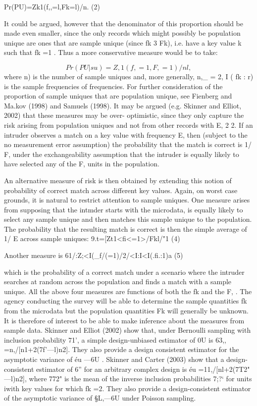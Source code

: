 Pr(PU)=Zk1(f,,=l,Fk=l)/n. (2)

It could be argued, however that the denominator of this proportion should be made even
smaller, since the only records which might possibly be population unique are ones that
are sample unique (since fk 3 Fk), i.e. have a key value k such that fk =1 . Thus a more
conservative measure would be to take:

\[Pr(PU | su) =Z,1(f, = 1, F, =1)/nl, \]
where n) is the number of sample uniques and, more generally, n,_ = 2, I ( fk : r) is the
sample frequencies of frequencies. For further consideration of the proportion of sample
uniques that are population unique, see Fienberg and Ma.kov (1998) and Samuels (1998).
It may be argued (e.g. Skinner and Elliot, 2002) that these measures may be over-
optimistic, since they only capture the risk arising from population uniques and not from
other records with E, 2 2. If an intruder observes a match on a key value with frequency
E, then (subject to the no measurement error assumption) the probability that the match
is correct is 1/ F, under the exchangeability assumption that the intruder is equally likely
to have selected any of the F, units in the population. 

An alternative measure of risk is
then obtained by extending this notion of probability of correct match across different
key values. Again, on worst case grounds, it is natural to restrict attention to sample
uniques. One measure arises from supposing that the intmder starts with the microdata, is
equally likely to select any sample unique and then matches this sample unique to the
population. The probability that the resulting match is correct is then the simple average
of 1/ E across sample uniques:
9.t=[Zt1<ﬁ<=1>/Fkl/"1 (4)

Another measure is
61/:Z;<I(_f/(=1)/2/<I:I<I(.ﬁ.:1)a (5)

which is the probability of a correct match under a scenario where the intruder searches at
random across the population and finds a match with a sample unique.
All the above four measures are functions of both the fk and the F, . The agency
conducting the survey will be able to determine the sample quantities fk from the
microdata but the population quantities Fk will generally be unknown. It is therefore of
interest to be able to make inference about the measures from sample data.
Skinner and Elliot (2002) show that, under Bernoulli sampling with inclusion
probability 71', a simple design-unbiased estimator of 0U is 63,, =n,/[n1+2(7f'—l)n2].
They also provide a design consistent estimator for the asymptotic variance of éu —6U .
Skinner and Carter (2003) show that a design-consistent estimator of 6” for an arbitrary
complex design is éu =11,/[nl+2(7T2" —l)n2], where 772" is the mean of the inverse
inclusion probabilities 7;?‘ for units iwith key values for which fk =2. They also
provide a design-consistent estimator of the asymptotic variance of §L,—6U under
Poisson sampling.

